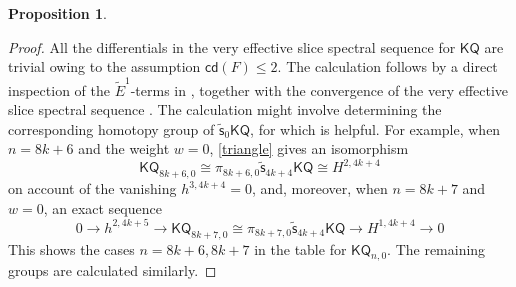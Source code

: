 \documentclass[11pt,hyp,english]{article}
\newcommand{\KQ}{\mathsf{KQ}}
\newcommand{\GW}{\mathsf{GW}}
\newcommand{\wt}[1]{\widetilde{#1}}
\newcommand{\vs}{\tilde{\mathsf{s}}}
\newcommand{\f}{\mathsf{f}}
\newcommand{\cd}{{\mathsf{cd}}}
\newtheorem{proposition}[theorem]{Proposition}
\theoremstyle{definition}
\begin{document}
\begin{proposition}
\end{proposition}
\begin{proof}
All the differentials in the very effective slice spectral sequence for $\KQ$ are trivial owing to the assumption $\cd(F)\leq 2$. 
The calculation follows by a direct inspection of the $\tilde{E}^1$-terms in , together with the convergence of the very effective slice spectral sequence . 
The calculation might involve determining the corresponding homotopy group of $\vs_0\KQ$, for which  is helpful.
For example, when $n=8k+6$ and the weight $w=0$, 
\eqref{triangle} gives an isomorphism 
$$
\KQ_{8k+6,0}
\cong 
\pi_{8k+6,0}\vs_{4k+4}\KQ 
\cong 
{H}^{2,4k+4}
$$
on account of the vanishing $h^{3,4k+4}=0$, and, moreover, when $n=8k+7$ and $w=0$, an exact sequence
\[
0\to h^{2,4k+5}\to
\KQ_{8k+7,0}
\cong 
\pi_{8k+7,0}\vs_{4k+4}\KQ 
\to 
{H}^{1,4k+4}
\to 0
\]
This shows the cases $n=8k+6, 8k+7$ in the table for $\KQ_{n,0}$. 
The remaining groups are calculated similarly.
\end{proof}


\end{document}
